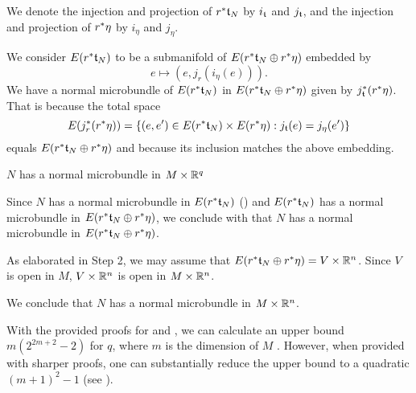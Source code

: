 \begin{scope}
\begin{myproof}
\begin{steps}
            We denote the injection and projection of $r^*\mathfrak{t}_N$ by $i_{\mathfrak{t}}$ and $j_{\mathfrak{t}}$,
            and the injection and projection of $r^*\eta$ by $i_{\eta}$ and $j_{\eta}$.

            We consider $E(r^*\mathfrak{t}_N)$ to be a submanifold of $E(r^*\mathfrak{t}_N \oplus{} r^*\eta)$ embedded by
            \[ e \mapsto (e, j_{r}(i_{\eta}(e))). \]
            We have a normal microbundle of $E(r^*\mathfrak{t}_N)$ in $E(r^*\mathfrak{t}_N \oplus{} r^*\eta)$ given by $j_{\mathfrak{t}}^*(r^*\eta)$.
            That is because the total space
            \[ E(j_r^*(r^*\eta)) = \{(e, e') \in E(r^*\mathfrak{t}_N) \times E(r^*\eta):j_{\mathfrak{t}}(e) = j_\eta(e')\} \]
            equals $E(r^*\mathfrak{t}_N \oplus{} r^*\eta)$ and because its inclusion matches the above embedding.
            
            \item $N$ has a normal microbundle in $M \times \mathbb{R}^q$
            
            Since $N$ has a normal microbundle in $E(r^*\mathfrak{t}_N)$ ()
            and $E(r^*\mathfrak{t}_N)$ has a normal microbundle in $E(r^*\mathfrak{t}_N \oplus{} r^*\eta)$,
            we conclude with  that
            $N$ has a normal microbundle in $E(r^*\mathfrak{t}_N \oplus{} r^*\eta)$.
            
            As elaborated in Step 2, we may assume that $E(r^*\mathfrak{t}_N \oplus{} r^*\eta) = V \times \mathbb{R}^n$.
            Since $V$ is open in $M$, $V \times \mathbb{R}^n$ is open in $M \times \mathbb{R}^n$.
        \end{steps}
        We conclude that $N$ has a normal microbundle in $M \times \mathbb{R}^n$.
    \end{myproof}

    \begin{myparagraph}
        With the provided proofs for  and ,
        we can calculate an upper bound $m(2^{2m + 2} - 2)$ for $q$, where $m$ is the dimension of $M$ \cite[p.63]{milnor}.
        However, when provided with sharper proofs,
        one can substantially reduce the upper bound
        to a quadratic $(m + 1)^2 - 1$ (see \cite[p.232]{hirsch}). 
    \end{myparagraph}
\end{scope}